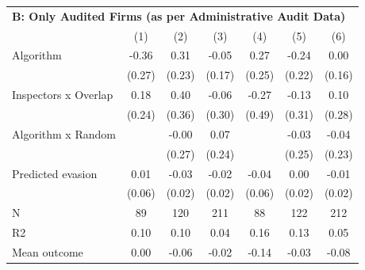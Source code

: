 \begin{tabular}{lccc|ccc}
\midrule \multicolumn{7}{l}{\textbf{B: Only Audited Firms (as per Administrative Audit Data)}} \\ \multicolumn{1}{l}{} & (1) & (2) & (3) & (4) & (5) & (6) \\ \midrule

Algorithm   &       -0.36         &        0.31         &       -0.05         &        0.27         &       -0.24         &        0.00         \\
            &      (0.27)         &      (0.23)         &      (0.17)         &      (0.25)         &      (0.22)         &      (0.16)         \\
\addlinespace
Inspectors x Overlap&        0.18         &        0.40         &       -0.06         &       -0.27         &       -0.13         &        0.10         \\
            &      (0.24)         &      (0.36)         &      (0.30)         &      (0.49)         &      (0.31)         &      (0.28)         \\
\addlinespace
Algorithm x Random&                     &       -0.00         &        0.07         &                     &       -0.03         &       -0.04         \\
            &                     &      (0.27)         &      (0.24)         &                     &      (0.25)         &      (0.23)         \\
\addlinespace
Predicted evasion&        0.01         &       -0.03         &       -0.02         &       -0.04         &        0.00         &       -0.01         \\
            &      (0.06)         &      (0.02)         &      (0.02)         &      (0.06)         &      (0.02)         &      (0.02)         \\
\midrule
N           &          89         &         120         &         211         &          88         &         122         &         212         \\
R2          &        0.10         &        0.10         &        0.04         &        0.16         &        0.13         &        0.05         \\
Mean outcome&        0.00         &       -0.06         &       -0.02         &       -0.14         &       -0.03         &       -0.08         \\
\bottomrule \end{tabular}
